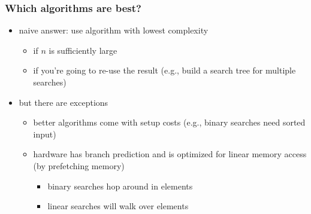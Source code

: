 \begin{frame}
 \frametitle{Which algorithms are best?}
 \begin{itemize}
  \item naive answer: use algorithm with lowest complexity
  \begin{itemize}
   \item if \(n\) is sufficiently large
   \item if you're going to re-use the result (e.g., build a search tree for multiple searches)
  \end{itemize}
  \item but there are exceptions
  \begin{itemize}
   \item better algorithms come with setup costs (e.g., binary searches need sorted input)
   \item hardware has branch prediction and is optimized for linear memory access (by prefetching memory)
   \begin{itemize}
    \item binary searches hop around in elements
    \item linear searches will walk over elements
   \end{itemize}
  \end{itemize}
 \end{itemize}
\end{frame}
